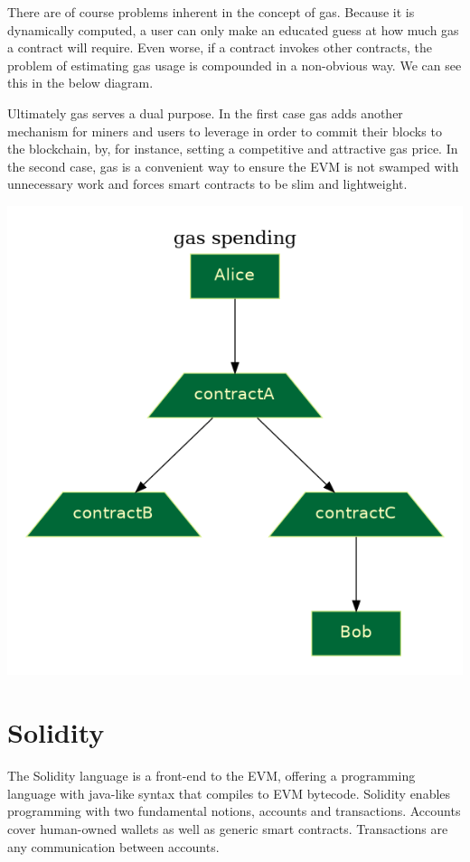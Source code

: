 \documentclass[twoside]{article}
\begin{document}
There are of course problems inherent in the concept of gas.  Because it is
dynamically computed, a user can only make an educated guess at how much gas a
contract will require.  Even worse, if a contract invokes other contracts, the
problem of estimating gas usage is compounded in a non-obvious way.  We can see
this in the below diagram.

Ultimately gas serves a dual purpose.  In the first case gas adds another
mechanism for miners and users to leverage in order to commit their blocks to
the blockchain, by, for instance, setting a competitive and attractive gas
price.  In the second case, gas is a convenient way to ensure the EVM is not
swamped with unnecessary work and forces smart contracts to be slim and
lightweight.  

\includegraphics[scale=0.35]{gas}

\section{Solidity}

The Solidity language is a front-end to the EVM, offering a programming language
with java-like syntax that compiles to EVM bytecode.  Solidity enables
programming with two fundamental notions, accounts and transactions.  Accounts
cover human-owned wallets as well as generic smart contracts.  Transactions are
any communication between accounts.
\end{document}
